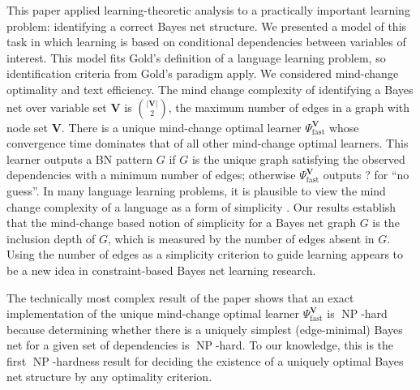 \documentclass{elsarticle}%
\DeclareMathOperator{\NP}{\mathbf{\mathrm{NP}}}
\newcommand{\fast}{\mathrm{fast}}
\begin{document}
This paper applied learning-theoretic analysis to a practically important learning problem: identifying a
correct
Bayes net structure.
We presented a model of this task in which learning is based on conditional dependencies between variables of interest. This model fits Gold's definition of a language learning problem, so identification criteria from Gold's paradigm apply. We considered mind-change optimality and text efficiency. %
The mind change complexity of identifying a Bayes net over variable set $\mathbf{V}$ is ${\binom{|\mathbf{V}|}{2}}$, the maximum number of edges in a graph with node set $\mathbf{V}$. There is a unique mind-change optimal learner $\Psi_{\fast}^{\mathbf{V}}$ whose convergence time dominates that of all other mind-change optimal learners. This learner outputs a BN pattern $G$ if $G$ is the unique graph satisfying the observed dependencies with a minimum number of edges; otherwise $\Psi_{\fast}^{\mathbf{V}}$ outputs ? for ``no guess''. In many language learning problems, it is plausible to view the mind change complexity of a language %
as a form of simplicity \cite[Sec.4]{luo06:_mind_chang_effic_learn}. Our results establish that the mind-change based notion of simplicity for a Bayes net graph $G$ is the inclusion depth of $G$, which %
is measured by the number of edges absent in $G$. 
Using the number of edges as a simplicity criterion to guide learning 
appears to be a new idea in constraint-based Bayes net learning research.

The technically most complex result of the paper shows that an exact implementation of the unique mind-change optimal learner $\Psi_{\fast}^{\mathbf{V}}$ is $\NP$-hard because determining whether there is a uniquely simplest (edge-minimal) Bayes net for a given set of dependencies is $\NP$-hard. To our knowledge, this is the first $\NP$-hardness result for deciding the existence of a uniquely optimal Bayes net structure by any optimality criterion. 
\end{document}
